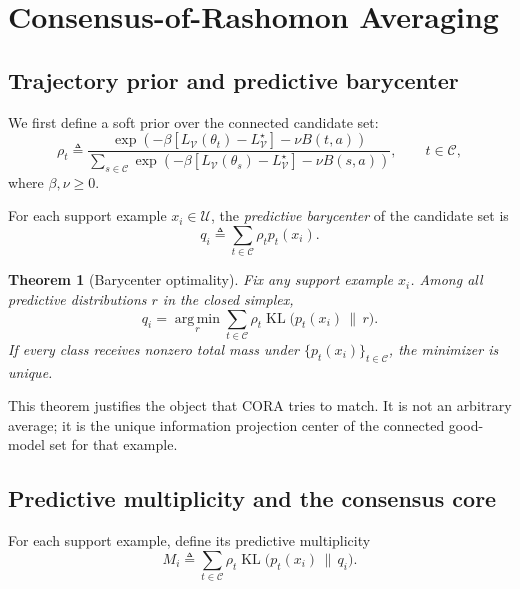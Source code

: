 \documentclass{article}
\newtheorem{theorem}{Theorem}
\newcommand{\cC}{\mathcal{C}}
\newcommand{\cU}{\mathcal{U}}
\newcommand{\cV}{\mathcal{V}}
\newcommand{\argmin}{\operatorname*{arg\,min}}
\newcommand{\KL}{\operatorname{KL}}
\newcommand{\cora}{\textup{\textsc{CORA}}}
\begin{document}
\section{Consensus-of-Rashomon Averaging}
\label{sec:method}

\subsection{Trajectory prior and predictive barycenter}

We first define a soft prior over the connected candidate set:
\begin{equation}
    \rho_t
    \triangleq
    \frac{
        \exp\!\left(-\beta [L_{\cV}(\theta_t)-L_{\cV}^{\star}] - \nu B(t,a)\right)
    }{
        \sum_{s\in\cC}
        \exp\!\left(-\beta [L_{\cV}(\theta_s)-L_{\cV}^{\star}] - \nu B(s,a)\right)
    },
    \qquad
    t \in \cC,
    \label{eq:rho}
\end{equation}
where $\beta,\nu \ge 0$.

For each support example $x_i \in \cU$, the \emph{predictive barycenter} of the candidate set is
\begin{equation}
    q_i
    \triangleq
    \sum_{t\in\cC} \rho_t p_t(x_i).
    \label{eq:barycenter}
\end{equation}

\begin{theorem}[Barycenter optimality]
\label{thm:barycenter}
Fix any support example $x_i$. Among all predictive distributions $r$ in the closed simplex,
\begin{equation}
    q_i
    =
    \argmin_{r}
    \sum_{t\in\cC} \rho_t \KL\!\big(p_t(x_i) \,\|\, r\big).
    \label{eq:barycenter_opt}
\end{equation}
If every class receives nonzero total mass under $\{p_t(x_i)\}_{t\in\cC}$, the minimizer is unique.
\end{theorem}

This theorem justifies the object that \cora{} tries to match. It is not an arbitrary average; it is the unique information projection center of the connected good-model set for that example.

\subsection{Predictive multiplicity and the consensus core}

For each support example, define its predictive multiplicity
\begin{equation}
    M_i
    \triangleq
    \sum_{t\in\cC} \rho_t \KL\!\big(p_t(x_i)\,\|\,q_i\big).
    \label{eq:multiplicity}
\end{equation}
\end{document}
